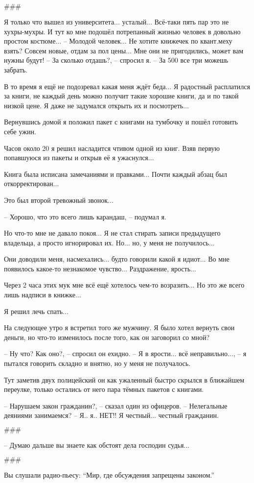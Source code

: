 \begin{center}\( \#\#\# \)\end{center}

Я только что вышел из университета... усталый... Всё-таки пять пар это не хухры-мухры.
И тут ко мне подошёл потрепанный жизнью человек в довольно простом костюме...
-- Молодой человек... Не хотите книжечек по квант.меху взять? Совсем новые, отдам за пол цены...
Мне они не пригодились, может вам нужны будут!
-- За сколько отдашь?, -- спросил я.
-- За 500 все три можешь забрать.

В то время я ещё не подозревал какая меня ждёт беда... Я радостный расплатился за книги, не каждый день можно получит такие хорошие книги, да и по такой низкой цене. Я даже не задумался открыть их и посмотреть...

Вернувшись домой я положил пакет с книгами на тумбочку и пошёл готовить себе ужин.

Часов около 20 я решил насладится чтивом одной из книг. Взяв первую попавшуюся из пакеты и открыв её я ужаснулся...

Книга была исписана замечаниями и правками... Почти каждый абзац был откорректирован...

Это был второй тревожный звонок...

-- Хорошо, что это всего лишь карандаш, -- подумал я.

Но что-то мне не давало покоя... Я не стал стирать записи предыдущего владельца, а просто игнорировал их.
Но... но, у меня не получилось...

Они доводили меня, насмехались... будто говорили какой я идиот... Во мне появилось какое-то незнакомое чувство...
Раздражение, ярость...

Через 2 часа этих мук мне всё ещё хотелось чем-то возразить... Но это же всего лишь надписи в книжке...

Я решил лечь спать...

На следующее утро я встретил того же мужчину. Я было хотел вернуть свои деньги, но что-то изменилось после того, как он заговорил со мной?

-- Ну что? Как оно?, -- спросил он ехидно.
-- Я в ярости... всё неправильно..., -- я пытался говорить складно и внятно, но у меня не получалось.

Тут заметив двух полицейский он как ужаленный быстро скрылся в ближайшем переулке, только остались от него пара тёмных пакетов с книгами.

-- Нарушаем закон гражданин?, -- сказал один из офицеров. -- Нелегальные деяниями занимаемся?
-- Я.. я.. НЕТ!! Я честный... честный гражданин.

\begin{center}\( \#\#\# \)\end{center}

-- Думаю дальше вы знаете как обстоят дела господин судья...

\begin{center}\( \#\#\# \)\end{center}

Вы слушали радио-пьесу: ``Мир, где обсуждения запрещены законом.''